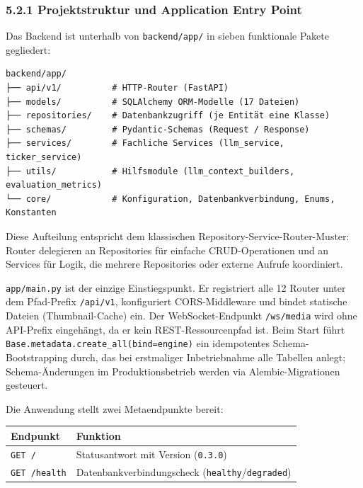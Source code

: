 \subsubsection{5.2.1 Projektstruktur und Application Entry
Point}\label{projektstruktur-und-application-entry-point}

Das Backend ist unterhalb von \texttt{backend/app/} in sieben
funktionale Pakete gegliedert:

\begin{verbatim}
backend/app/
├── api/v1/          # HTTP-Router (FastAPI)
├── models/          # SQLAlchemy ORM-Modelle (17 Dateien)
├── repositories/    # Datenbankzugriff (je Entität eine Klasse)
├── schemas/         # Pydantic-Schemas (Request / Response)
├── services/        # Fachliche Services (llm_service, ticker_service)
├── utils/           # Hilfsmodule (llm_context_builders, evaluation_metrics)
└── core/            # Konfiguration, Datenbankverbindung, Enums, Konstanten
\end{verbatim}

Diese Aufteilung entspricht dem klassischen
Repository-Service-Router-Muster: Router delegieren an Repositories für
einfache CRUD-Operationen und an Services für Logik, die mehrere
Repositories oder externe Aufrufe koordiniert.

\texttt{app/main.py} ist der einzige Einstiegspunkt. Er registriert alle
12 Router unter dem Pfad-Prefix \texttt{/api/v1}, konfiguriert
CORS-Middleware und bindet statische Dateien (Thumbnail-Cache) ein. Der
WebSocket-Endpunkt \texttt{/ws/media} wird ohne API-Prefix eingehängt,
da er kein REST-Ressourcenpfad ist. Beim Start führt
\texttt{Base.metadata.create\_all(bind=engine)} ein idempotentes
Schema-Bootstrapping durch, das bei erstmaliger Inbetriebnahme alle
Tabellen anlegt; Schema-Änderungen im Produktionsbetrieb werden via
Alembic-Migrationen gesteuert.

Die Anwendung stellt zwei Metaendpunkte bereit:

{\def\LTcaptype{none} %
\begin{longtable}[]{@{}ll@{}}
\toprule\noalign{}
Endpunkt & Funktion \\
\midrule\noalign{}
\endhead
\bottomrule\noalign{}
\endlastfoot
\texttt{GET\ /} & Statusantwort mit Version (\texttt{0.3.0}) \\
\texttt{GET\ /health} & Datenbankverbindungscheck
(\texttt{healthy}/\texttt{degraded}) \\
\end{longtable}
}

